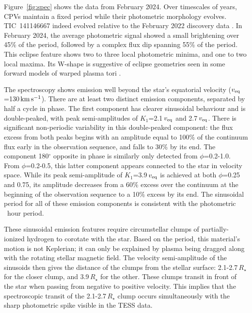 \documentclass{nature3}
\newcommand{\kms}{\ensuremath{\rm km\,s^{-1}}}
\begin{document}
Figure~\ref{fig:spec} shows the data from February 2024.  Over
timescales of years, CPVs maintain a fixed period while their
photometric morphology evolves.  TIC~141146667 indeed evolved relative
to the February 2022 discovery data \cite{Bouma2024}.  In February
2024, the average photometric signal showed a small brightening
over 45\% of the period, followed by a complex flux dip spanning 55\%
of the period.  This eclipse feature shows two to three local
photometric minima, and one to two local maxima.  Its W-shape is
suggestive of eclipse geometries seen in some forward models of warped
plasma tori \cite{Townsend2008}.

The spectroscopy shows emission well beyond the star's equatorial
velocity ($v_{\rm eq}$=130\,\kms).  There are at least two distinct
emission components, separated by half a cycle in phase.  The first
component has clearer sinusoidal behaviour and is double-peaked, with
peak semi-amplitudes of $K_1$=2.1\,$v_{\rm eq}$ and 2.7\,$v_{\rm eq}$.
There is significant non-periodic variability in this double-peaked
component: the flux excess from both peaks begins with an amplitude
equal to 100\% of the continuum flux early in the observation
sequence, and falls to 30\% by its end.  The component 180$^\circ$
opposite in phase is similarly only detected from $\phi$=0.2-1.0.
From $\phi$=0.2-0.5, this latter component appears connected to the
star in velocity space.  While its peak semi-amplitude of
$K_1$=3.9\,$v_{\rm eq}$ is achieved at both $\phi$=0.25 and 0.75, its
amplitude decreases from a 60\% excess over the continuum at the
beginning of the observation sequence to a 10\% excess by its end.
The sinusoidal period for all of these emission components is
consistent with the photometric \periodhr\ hour period.  

These sinusoidal emission features require circumstellar clumps of
partially-ionized hydrogen to corotate with the star.  
Based on the period, this material's motion is not Keplerian; it can
only be explained by plasma being dragged along with the rotating
stellar magnetic field. 
The velocity semi-amplitude of the sinusoids then gives the distance
of the clumps from the stellar surface: 2.1-2.7\,$R_\star$ for the
closer clump, and 3.9\,$R_\star$ for the other.   These clumps transit
in front of the star when passing from negative to positive velocity.
This implies that the spectroscopic transit of the 2.1-2.7\,$R_\star$
clump occurs simultaneously with the sharp photometric spike visible
in the TESS data.
\end{document}
